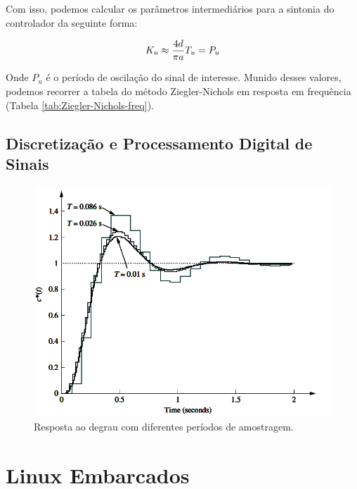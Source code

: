 Com isso, podemos calcular os parâmetros intermediários para a sintonia do controlador da seguinte forma:

\begin{equation}
  K_u \approx \frac{4d}{\pi a} \\
  T_u = P_u
\end{equation}

Onde $P_u$ é o período de oscilação do sinal de interesse. Munido desses valores, podemos recorrer a tabela do método Ziegler-Nichols em resposta em frequência (Tabela \ref{tab:Ziegler-Nichols-freq}).



\subsection{Discretização e Processamento Digital de Sinais}

\begin{figure}[!ht]
  \caption{Resposta ao degrau com diferentes períodos de amostragem.}
  \begin{center}
      \includegraphics[scale=0.55]{img/nise_digitalinput_p761}
  \end{center}
  \label{fig:nise_digitalinput_p761}
\end{figure}



\section{Linux Embarcados}

